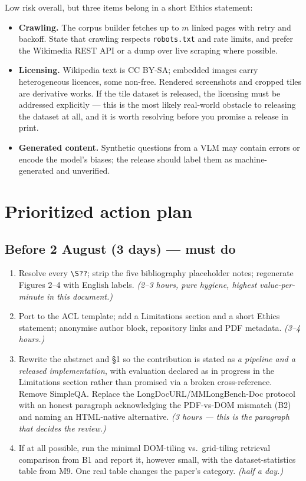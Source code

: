\documentclass[11pt,a4paper]{article}
\begin{document}
Low risk overall, but three items belong in a short Ethics statement:
\begin{itemize}
\item \textbf{Crawling.} The corpus builder fetches up to $m$ linked pages with retry and
      backoff. State that crawling respects \texttt{robots.txt} and rate limits, and prefer
      the Wikimedia REST API or a dump over live scraping where possible.
\item \textbf{Licensing.} Wikipedia text is CC BY-SA; embedded images carry heterogeneous
      licences, some non-free. Rendered screenshots and cropped tiles are derivative works.
      If the tile dataset is released, the licensing must be addressed explicitly --- this is
      the most likely real-world obstacle to releasing the dataset at all, and it is worth
      resolving before you promise a release in print.
\item \textbf{Generated content.} Synthetic questions from a VLM may contain errors or
      encode the model's biases; the release should label them as machine-generated and
      unverified.
\end{itemize}

\section{Prioritized action plan}
\label{sec:plan}

\subsection*{Before 2 August (3 days) --- must do}
\begin{enumerate}
\item Resolve every \verb|\S??|; strip the five bibliography placeholder notes; regenerate
      Figures 2--4 with English labels. \emph{(2--3 hours, pure hygiene, highest
      value-per-minute in this document.)}
\item Port to the ACL template; add a Limitations section and a short Ethics statement;
      anonymise author block, repository links and PDF metadata. \emph{(3--4 hours.)}
\item Rewrite the abstract and \S1 so the contribution is stated as \emph{a pipeline and a
      released implementation}, with evaluation declared as in progress in the Limitations
      section rather than promised via a broken cross-reference. Remove SimpleQA. Replace the
      LongDocURL/MMLongBench-Doc protocol with an honest paragraph acknowledging the
      PDF-vs-DOM mismatch (B2) and naming an HTML-native alternative. \emph{(3 hours ---
      this is the paragraph that decides the review.)}
\item If at all possible, run the minimal DOM-tiling vs.\ grid-tiling retrieval comparison
      from B1 and report it, however small, with the dataset-statistics table from M9.
      One real table changes the paper's category. \emph{(half a day.)}
\end{enumerate}
\end{document}
